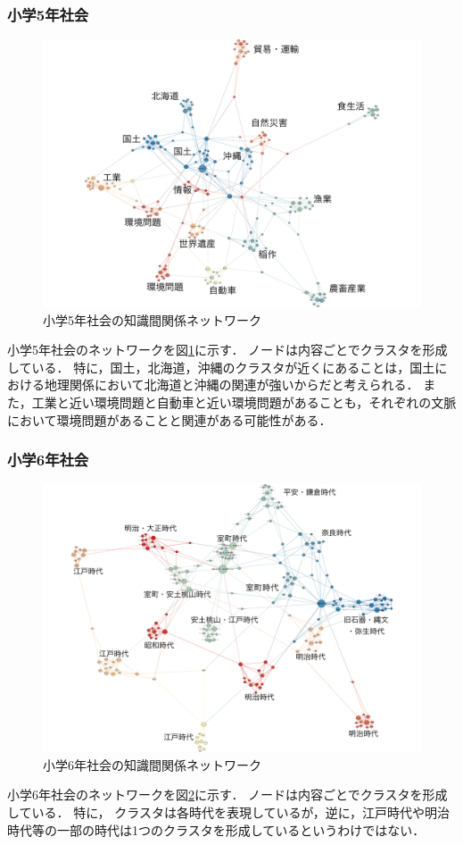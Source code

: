 \subsubsection{小学5年社会}
\begin{figure}[!htb]
\begin{center}
	\includegraphics[width=330pt]{./img/s5_soc_label2.pdf}
	\caption{小学5年社会の知識間関係ネットワーク}
	\label{fig:net_s5soc}
\end{center}
\end{figure}
小学5年社会のネットワークを図\ref{fig:net_s5soc}に示す．
ノードは内容ごとでクラスタを形成している．
特に，国土，北海道，沖縄のクラスタが近くにあることは，国土における地理関係において北海道と沖縄の関連が強いからだと考えられる．
また，工業と近い環境問題と自動車と近い環境問題があることも，それぞれの文脈において環境問題があることと関連がある可能性がある．

\subsubsection{小学6年社会}
\begin{figure}[!htb]
\begin{center}
	\includegraphics[width=330pt]{./img/s6_soc_label2.pdf}
	\caption{小学6年社会の知識間関係ネットワーク}
	\label{fig:net_s6soc}
\end{center}
\end{figure}
小学6年社会のネットワークを図\ref{fig:net_s6soc}に示す．
ノードは内容ごとでクラスタを形成している．
特に，
クラスタは各時代を表現しているが，逆に，江戸時代や明治時代等の一部の時代は1つのクラスタを形成しているというわけではない．


